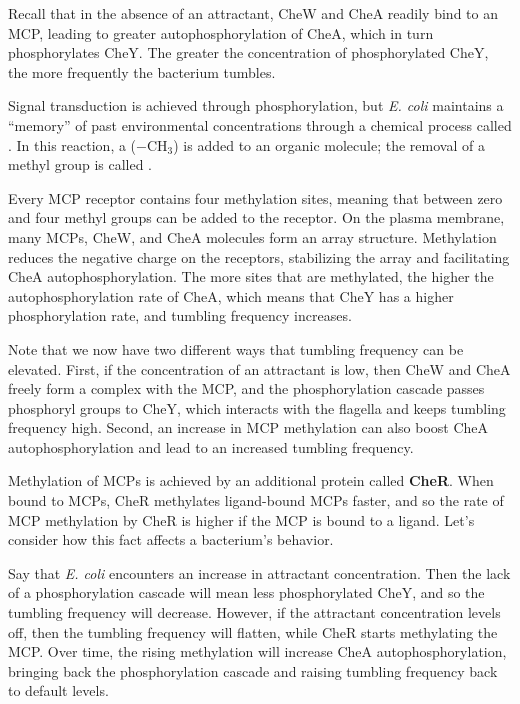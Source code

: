 Recall that in the absence of an attractant, CheW and CheA readily bind to an MCP, leading to greater autophosphorylation of CheA, which in turn phosphorylates CheY. The greater the concentration of phosphorylated CheY, the more frequently the bacterium tumbles.

Signal transduction is achieved through phosphorylation, but \textit{E. coli} maintains a ``memory'' of past environmental concentrations through a chemical process called . In this reaction, a  ($-\text{CH}_3$) is added to an organic molecule; the removal of a methyl group is called .

Every MCP receptor contains four methylation sites, meaning that between zero and four methyl groups can be added to the receptor. On the plasma membrane, many MCPs, CheW, and CheA molecules form an array structure. Methylation reduces the negative charge on the receptors, stabilizing the array and facilitating CheA autophosphorylation. The more sites that are methylated, the higher the autophosphorylation rate of CheA, which means that CheY has a higher phosphorylation rate, and tumbling frequency increases.

Note that we now have two different ways that tumbling frequency can be elevated. First, if the concentration of an attractant is low, then CheW and CheA freely form a complex with the MCP, and the phosphorylation cascade passes phosphoryl groups to CheY, which interacts with the flagella and keeps tumbling frequency high. Second, an increase in MCP methylation can also boost CheA autophosphorylation and lead to an increased tumbling frequency.

Methylation of MCPs is achieved by an additional protein called \textbf{CheR}. When bound to MCPs, CheR methylates ligand-bound MCPs faster, and so the rate of MCP methylation by CheR is higher if the MCP is bound to a ligand. Let's consider how this fact affects a bacterium's behavior.

Say that \textit{E. coli} encounters an increase in attractant concentration. Then the lack of a phosphorylation cascade will mean less phosphorylated CheY, and so the tumbling frequency will decrease. However, if the attractant concentration levels off, then the tumbling frequency will flatten, while CheR starts methylating the MCP. Over time, the rising methylation will increase CheA autophosphorylation, bringing back the phosphorylation cascade and raising tumbling frequency back to default levels.


